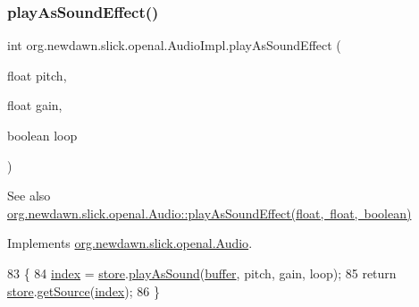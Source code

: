 \subsubsection{\texorpdfstring{play\+As\+Sound\+Effect()}{playAsSoundEffect()}\hspace{0.1cm}{\footnotesize\ttfamily [1/2]}}
{\footnotesize\ttfamily int org.\+newdawn.\+slick.\+openal.\+Audio\+Impl.\+play\+As\+Sound\+Effect (\begin{DoxyParamCaption}\item[{float}]{pitch,  }\item[{float}]{gain,  }\item[{boolean}]{loop }\end{DoxyParamCaption})\hspace{0.3cm}{\ttfamily [inline]}}

\begin{DoxySeeAlso}{See also}
\mbox{\hyperlink{interfaceorg_1_1newdawn_1_1slick_1_1openal_1_1_audio_a69c3621a4a4bcbe9f1711f569c54017b}{org.\+newdawn.\+slick.\+openal.\+Audio\+::play\+As\+Sound\+Effect(float, float, boolean)}} 
\end{DoxySeeAlso}


Implements \mbox{\hyperlink{interfaceorg_1_1newdawn_1_1slick_1_1openal_1_1_audio_a69c3621a4a4bcbe9f1711f569c54017b}{org.\+newdawn.\+slick.\+openal.\+Audio}}.


\begin{DoxyCode}
83                                                                         \{
84         \mbox{\hyperlink{classorg_1_1newdawn_1_1slick_1_1openal_1_1_audio_impl_ab0e80c9c431d4b6c9b667012f7f71b86}{index}} = \mbox{\hyperlink{classorg_1_1newdawn_1_1slick_1_1openal_1_1_audio_impl_a1f616264ac2d6ec44cb0c187836d34f5}{store}}.\mbox{\hyperlink{classorg_1_1newdawn_1_1slick_1_1openal_1_1_sound_store_a8ab9e98f32e3ec39095f6bac427c3d0a}{playAsSound}}(\mbox{\hyperlink{classorg_1_1newdawn_1_1slick_1_1openal_1_1_audio_impl_ac08b49601da30895fecfdca4e8ba0049}{buffer}}, pitch, gain, loop);
85         \textcolor{keywordflow}{return} \mbox{\hyperlink{classorg_1_1newdawn_1_1slick_1_1openal_1_1_audio_impl_a1f616264ac2d6ec44cb0c187836d34f5}{store}}.\mbox{\hyperlink{classorg_1_1newdawn_1_1slick_1_1openal_1_1_sound_store_a36b83b67fccef1cd5167d2ea11e89f6a}{getSource}}(\mbox{\hyperlink{classorg_1_1newdawn_1_1slick_1_1openal_1_1_audio_impl_ab0e80c9c431d4b6c9b667012f7f71b86}{index}});
86     \}
\end{DoxyCode}
\mbox{\label{classorg_1_1newdawn_1_1slick_1_1openal_1_1_audio_impl_a400627f68fca6dfd837fcce2d8536527}} 
